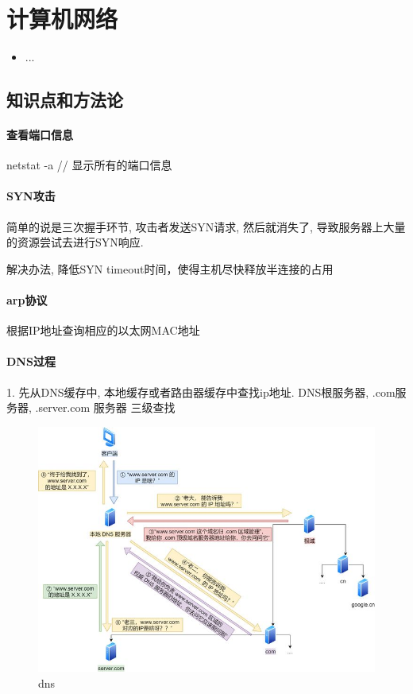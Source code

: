 \chapter{计算机网络}
\label{chap1}
\begin{itemize}[noitemsep,topsep=0pt,parsep=0pt,partopsep=0pt]
	\item ...
\end{itemize}

\section{知识点和方法论}
\subsubsection{查看端口信息}
netstat -a // 显示所有的端口信息
\subsubsection{SYN攻击}
简单的说是三次握手环节, 攻击者发送SYN请求, 然后就消失了, 导致服务器上大量的资源尝试去进行SYN响应.

解决办法, 降低SYN timeout时间，使得主机尽快释放半连接的占用

\subsubsection{arp协议}
根据IP地址查询相应的以太网MAC地址

\subsubsection{DNS过程}
1. 先从DNS缓存中, 本地缓存或者路由器缓存中查找ip地址. DNS根服务器, .com服务器, .server.com 服务器 三级查找

\begin{figure}
	\centering
	\includegraphics[width=0.7\linewidth]{figures/dns.jpg}
	\caption{dns}
	\label{fig:dns}
\end{figure}



